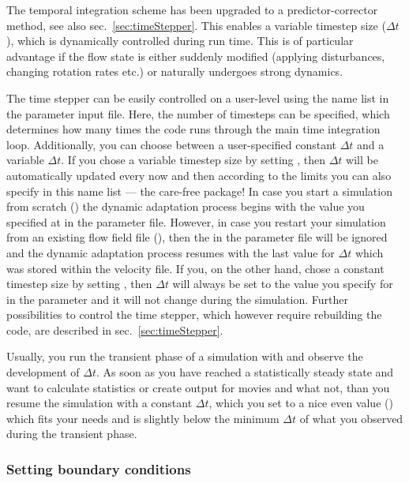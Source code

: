 \documentclass[a4paper, 11pt, DIV=11]{scrartcl}
\begin{document}
The temporal integration scheme has been upgraded to a predictor-corrector
method, see also sec.~\ref{sec:timeStepper}. This enables a variable timestep
size ($\Delta t$), which is dynamically controlled during run time. This is
of particular advantage if the flow state is either suddenly modified
(applying disturbances, changing rotation rates etc.) or naturally undergoes
strong dynamics.
\par
The time stepper can be easily controlled on a user-level using the name list
 in the parameter input file. Here, the number of
timesteps can be specified, which determines how many times the code runs
through the main time integration loop. Additionally, you can choose between
a user-specified constant $\Delta t$ and a variable $\Delta t$. If you chose
a variable timestep size by setting , then $\Delta t$ will 
be automatically updated every now and then according to the limits you can 
also specify in this name list --- the care-free package! In case
you start a simulation from scratch () the dynamic adaptation
process begins with the value you specified at  in the parameter
file. However, in case you restart your simulation from an existing flow field
file (), then the  in the parameter file will
be ignored and the dynamic adaptation process resumes with the last value for
$\Delta t$ which was stored within the velocity file. If you, on the other hand,
chose a constant timestep size by setting , then $\Delta t$
will always be set to the value you specify for  in the parameter
and it will not change during the simulation. Further possibilities to control the
time stepper, which however require rebuilding the code, are described in
sec.~\ref{sec:timeStepper}.
\par
Usually, you run the transient phase of a simulation with 
and observe the development of $\Delta t$. As soon as you have reached a statistically
steady state and want to calculate statistics or create output for movies and what not,
than you resume the simulation with a constant $\Delta t$, which you set to a nice even
value () which fits your needs and is slightly below the minimum
$\Delta t$ of what you observed during the transient phase.

\subsubsection{Setting boundary conditions}
\label{sec:boundaryConditions}
\end{document}
